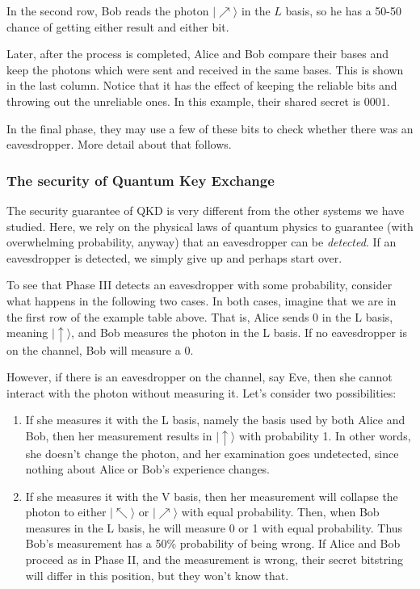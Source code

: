 \documentclass{article}
\theoremstyle{plain}
\theoremstyle{definition}
\theoremstyle{remark}
\numberwithin{theorem}{section}
\begin{document}
In the second row, Bob reads the photon $| \nearrow \rangle$ in the $L$ basis, so he has a 50-50 chance of getting either result and either bit.

Later, after the process is completed, Alice and Bob compare their bases and keep the photons which were sent and received in the same bases.   This is shown in the last column.  Notice that it has the effect of keeping the reliable bits and throwing out the unreliable ones.  In this example, their shared secret is $0001$.

In the final phase, they may use a few of these bits to check whether there was an eavesdropper.  More detail about that follows.


\subsubsection{The security of Quantum Key Exchange}

The security guarantee of QKD is very different from the other systems we have studied.  Here, we rely on the physical laws of quantum physics to guarantee (with overwhelming probability, anyway) that an eavesdropper can be \emph{detected}.  If an eavesdropper is detected, we simply give up and perhaps start over.

To see that Phase III detects an eavesdropper with some probability, consider what happens in the following two cases.  In both cases, imagine that we are in the first row of the example table above.  That is, Alice sends 0 in the L basis, meaning $| \uparrow \rangle$, and Bob measures the photon in the L basis.  If no eavesdropper is on the channel, Bob will measure a 0.


However, if there is an eavesdropper on the channel, say Eve, then she cannot interact with the photon without measuring it.  Let's consider two possibilities:

\begin{enumerate}
    \item If she measures it with the L basis, namely the basis used by both Alice and Bob, then her measurement results in $| \uparrow \rangle$ with probability 1.  In other words, she doesn't change the photon, and her examination goes undetected, since nothing about Alice or Bob's experience changes.
    \item If she measures it with the V basis, then her measurement will collapse the photon to either $| \nwarrow \rangle$ or $| \nearrow \rangle$ with equal probability.  Then, when Bob measures in the L basis, he will measure 0 or 1 with equal probability.  Thus Bob's measurement has a 50\% probability of being wrong.  If Alice and Bob proceed as in Phase II, and the measurement is wrong, their secret bitstring will differ in this position, but they won't know that.
\end{enumerate}
\end{document}
